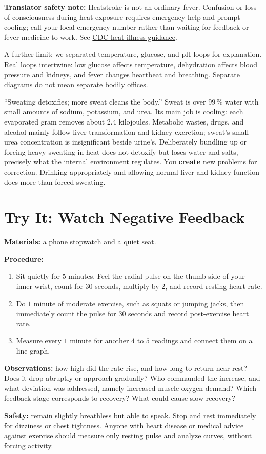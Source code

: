 \textbf{Translator safety note:} Heatstroke is not an ordinary fever. Confusion or loss of consciousness during heat exposure requires emergency help and prompt cooling; call your local emergency number rather than waiting for feedback or fever medicine to work. See \href{https://www.cdc.gov/niosh/heat-stress/about/illnesses.html}{CDC heat-illness guidance}.

A further limit: we separated temperature, glucose, and pH loops for explanation. Real loops intertwine: low glucose affects temperature, dehydration affects blood pressure and kidneys, and fever changes heartbeat and breathing. Separate diagrams do not mean separate bodily offices.

\begin{wuqu}
``Sweating detoxifies; more sweat cleans the body.'' Sweat is over $99\,\%$ water with small amounts of sodium, potassium, and urea. Its main job is cooling: each evaporated gram removes about $2.4$ kilojoules. Metabolic wastes, drugs, and alcohol mainly follow liver transformation and kidney excretion; sweat's small urea concentration is insignificant beside urine's. Deliberately bundling up or forcing heavy sweating in heat does not detoxify but loses water and salts, precisely what the internal environment regulates. You \textbf{create} new problems for correction. Drinking appropriately and allowing normal liver and kidney function does more than forced sweating.
\end{wuqu}

\section{Try It: Watch Negative Feedback}

\begin{shiyan}
\textbf{Materials:} a phone stopwatch and a quiet seat.

\textbf{Procedure:}
\begin{enumerate}[itemsep=1pt]
\item Sit quietly for $5$ minutes. Feel the radial pulse on the thumb side of your inner wrist, count for $30$ seconds, multiply by $2$, and record resting heart rate.
\item Do $1$ minute of moderate exercise, such as squats or jumping jacks, then immediately count the pulse for $30$ seconds and record post-exercise heart rate.
\item Measure every $1$ minute for another $4$ to $5$ readings and connect them on a line graph.
\end{enumerate}

\textbf{Observations:} how high did the rate rise, and how long to return near rest? Does it drop abruptly or approach gradually? Who commanded the increase, and what deviation was addressed, namely increased muscle oxygen demand? Which feedback stage corresponds to recovery? What could cause slow recovery?

\textbf{Safety:} remain slightly breathless but able to speak. Stop and rest immediately for dizziness or chest tightness. Anyone with heart disease or medical advice against exercise should measure only resting pulse and analyze curves, without forcing activity.
\end{shiyan}


